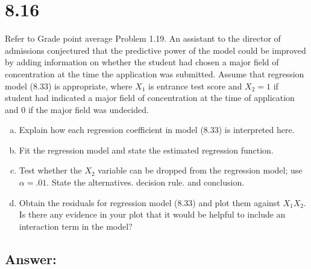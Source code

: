 \documentclass{article}
\begin{document}
\section{8.16}

Refer to Grade point average Problem 1.19. An assistant to the director of admissions conjectured that the predictive power of the model could be improved by adding information on whether the student had chosen a major field of concentration at the time the application was submitted. Assume that regression model (8.33) is appropriate, where $X_1$ is entrance test score and $X_2 = 1$ if student had indicated a major field of concentration at the time of application and 0 if the major field was undecided. 

\begin{enumerate}[a)]
\item{} Explain how each regression coefficient in model (8.33) is interpreted here.
\item{} Fit the regression model and state the estimated regression function.
\item{} Test whether the $X_2$ variable can be dropped from the regression model; use $\alpha{} = .01$. State the alternatives. decision rule. and conclusion.
\item{} Obtain the residuals for regression model (8.33) and plot them against $X_1X_2$. Is there any evidence in your plot that it would be helpful to include an interaction term in the model?
\end{enumerate}

\subsection{Answer:}
\end{document}
